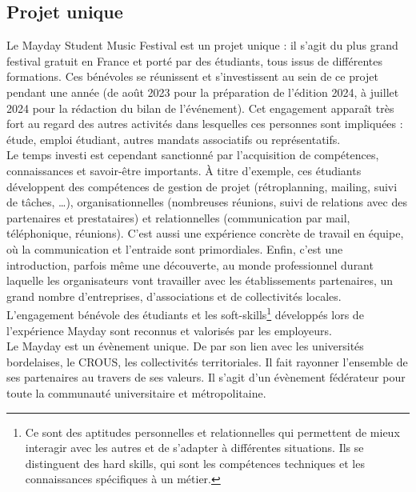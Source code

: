 \documentclass[12pt,a4paper]{report}
\begin{document}
\subsection*{Projet unique}

Le Mayday Student Music Festival est un projet unique : il s'agit du plus grand festival gratuit en France et porté par des étudiants, tous issus de différentes formations. Ces bénévoles se réunissent et s'investissent au sein de ce projet pendant une année (de août 2023 pour la préparation de l'édition 2024, à juillet 2024 pour la rédaction du bilan de l’événement). Cet engagement apparaît très fort au regard des autres activités dans lesquelles ces personnes sont impliquées : étude, emploi étudiant, autres mandats associatifs ou représentatifs.\\

\sloppy Le temps investi est cependant sanctionné par l'acquisition de compétences, connaissances et savoir-être importants. À titre d'exemple, ces étudiants développent des compétences de gestion de projet (rétroplanning, mailing, suivi de tâches, …), organisationnelles (nombreuses réunions, suivi de relations avec des partenaires et prestataires) et relationnelles (communication par mail, téléphonique, réunions). C’est aussi une expérience concrète de travail en équipe, où la communication et l'entraide sont primordiales. Enfin, c’est une introduction, parfois même une découverte, au monde professionnel durant laquelle les organisateurs vont travailler avec les établissements partenaires, un grand nombre d'entreprises, d’associations et de collectivités locales.\\

L’engagement bénévole des étudiants et les soft-skills\footnote{Ce sont des aptitudes personnelles et relationnelles qui permettent de mieux interagir avec les autres et de s'adapter à différentes situations. Ils se distinguent des hard skills, qui sont les compétences techniques et les connaissances spécifiques à un métier.} développés lors de l’expérience Mayday sont reconnus et valorisés par les employeurs.\\

Le Mayday est un évènement unique. De par son lien avec les universités bordelaises, le CROUS, les collectivités territoriales. Il fait rayonner l'ensemble de ses partenaires au travers de ses valeurs. Il s’agit d’un évènement fédérateur pour toute la communauté universitaire et métropolitaine.
\end{document}
